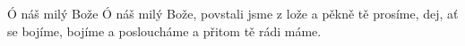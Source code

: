 \begin{TEXT}{Ó náš milý Bože}
\SLOKA* Ó náš milý Bože, 
povstali jsme z lože 
a pěkně tě prosíme, 
dej, ať se bojíme, 
bojíme a posloucháme 
a přitom tě rádi máme.
\end{TEXT}